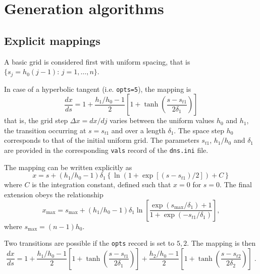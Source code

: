 \section{Generation algorithms}

\subsection{Explicit mappings}
A basic grid is considered first with uniform spacing, that is
$\{s_j=h_0(j-1):\, j = 1,\ldots,n\}$. 

In case of a hyperbolic tangent (i.e. {\tt opts=5}), the mapping is
\begin{equation}
\frac{dx}{ds} = 1 + \frac{h_1/h_0-1}{2}\left[ 1 + \tanh\left(\frac{s-s_{t1}}{2\delta_1}\right)\right]
\end{equation}
that is, the grid step $\Delta x =dx/dj$ varies between the uniform values $h_0$
and $h_1$, the transition occurring at $s=s_{t1}$ and over a length $\delta_1$. The
space step $h_0$ corresponds to that of the initial uniform grid. The parameters
$s_{t1}$, $h_1/h_0$ and $\delta_1$ are provided in the corresponding {\tt vals}
record of the {\tt dns.ini} file.

The mapping can be written explicitly as
\begin{equation}
  x = s + (h_1/h_0-1)\delta_1\left\{\ln(1+\exp[(s-s_{t1})/2])+C\right\}
\end{equation}
where $C$ is the integration constant, defined such that $x=0$ for $s=0$. The final extension obeys the relationship
\begin{equation}
  x_\mathrm{max}=s_\mathrm{max} + (h_1/h_0-1)\delta_1\ln\left[\frac{\exp(s_\mathrm{max}/\delta_1)+1}{1+\exp(-s_{t1}/\delta_1)}\right],
\end{equation}
where $s_\mathrm{max} =(n-1)h_0$.

Two transitions are possible if the {\tt opts} record is set to $5,2$. The
mapping is then
\begin{equation}
\frac{dx}{ds} = 1 
+ \frac{h_1/h_0-1}{2}\left[ 1 + \tanh\left(\frac{s-s_{t1}}{2\delta_1}\right)\right]
+ \frac{h_2/h_0-1}{2}\left[ 1 + \tanh\left(\frac{s-s_{t2}}{2\delta_2}\right)\right]\;.
\end{equation}

